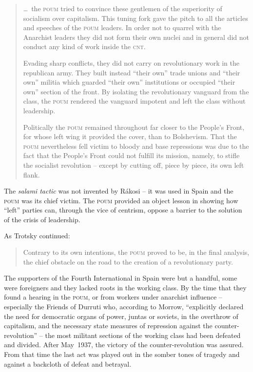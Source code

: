 \begin{quotation}
  \noindent
  \dots\ the \textsc{poum} tried to convince these gentlemen of the superiority of socialism over capitalism. This tuning fork gave the pitch to all the articles and speeches of the \textsc{poum} leaders. In order not to quarrel with the Anarchist leaders they did not form their own nuclei and in general did not conduct any kind of work inside the \textsc{cnt}.
  
  Evading sharp conflicts, they did not carry on revolutionary work in the republican army. They built instead ``their own'' trade unions and ``their own'' militia which guarded ``their own'' institutions or occupied ``their own'' section of the front. By isolating the revolutionary vanguard from the class, the \textsc{poum} rendered the vanguard impotent and left the class without leadership.
  
  Politically the \textsc{poum} remained throughout far closer to the People’s Front, for whose left wing it provided the cover, than to Bolshevism. That the \textsc{poum} nevertheless fell victim to bloody and base repressions was due to the fact that the People’s Front could not fulfill its mission, namely, to stifle the socialist revolution -- except by cutting off, piece by piece, its own left flank.
\end{quotation}

The \emph{salami tactic} was not invented by R\'akosi -- it was used in Spain and the \textsc{poum} was its chief victim. The \textsc{poum} provided an object lesson in showing how ``left'' parties can, through the vice of centrism, oppose a barrier to the solution of the crisis of leadership.

As Trotsky continued:

\begin{quotation}\indexPOUM
  Contrary to its own intentions, the \textsc{poum} proved to be, in the final analysis, the chief obstacle on the road to the creation of a revolutionary party.
\end{quotation}

The supporters of the Fourth International in Spain were but a handful, some were foreigners and they lacked roots in the working class. By the time that they found a hearing in the \textsc{poum}, or from workers under anarchist influence -- especially the Friends of Durruti who, according to Morrow, ``explicitly declared the need for democratic organs of power, juntas or soviets, in the overthrow of capitalism, and the necessary state measures of repression against the  counter-revolution'' -- the most militant sections of the working class had been defeated and divided. After May~1937, the victory of the counter-revolution was assured. From that time the last act was played out in the somber tones of tragedy and against a backcloth of defeat and betrayal.

